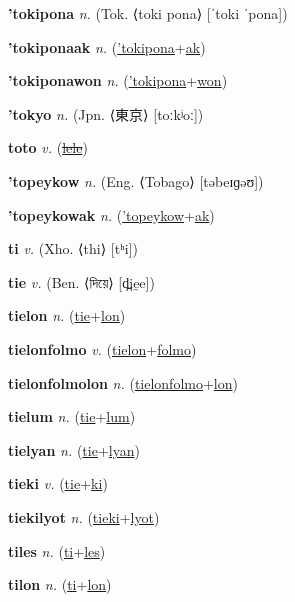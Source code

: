 \textbf{\hypertarget{'tokipona}{'tokipona}} \textit{n.} (Tok. ⟨toki pona⟩ [ˈtoki ˈpona])


\textbf{\hypertarget{'tokiponaak}{'tokiponaak}} \textit{n.} (\hyperlink{'tokipona}{'tokipona}+\allowbreak \hyperlink{ak}{ak})


\textbf{\hypertarget{'tokiponawon}{'tokiponawon}} \textit{n.} (\hyperlink{'tokipona}{'tokipona}+\allowbreak \hyperlink{won}{won})


\textbf{\hypertarget{'tokyo}{'tokyo}} \textit{n.} (Jpn. ⟨{\japanese{}東京}⟩ [toːkʲoː])


\textbf{\hypertarget{toto}{toto}} \textit{v.} (\hyperlink{lele}{\sout{lele}})


\textbf{\hypertarget{'topeykow}{'topeykow}} \textit{n.} (Eng. ⟨Tobago⟩ [təbeɪɡəʊ])


\textbf{\hypertarget{'topeykowak}{'topeykowak}} \textit{n.} (\hyperlink{'topeykow}{'topeykow}+\allowbreak \hyperlink{ak}{ak})


\textbf{\hypertarget{ti}{ti}} \textit{v.} (Xho. ⟨thi⟩ [tʰi])


\textbf{\hypertarget{tie}{tie}} \textit{v.} (Ben. ⟨{\bengali{}দিয়ে}⟩ [d̪ie̯e])


\textbf{\hypertarget{tielon}{tielon}} \textit{n.} (\hyperlink{tie}{tie}+\allowbreak \hyperlink{lon}{lon})


\textbf{\hypertarget{tielonfolmo}{tielonfolmo}} \textit{v.} (\hyperlink{tielon}{tielon}+\allowbreak \hyperlink{folmo}{folmo})


\textbf{\hypertarget{tielonfolmolon}{tielonfolmolon}} \textit{n.} (\hyperlink{tielonfolmo}{tielonfolmo}+\allowbreak \hyperlink{lon}{lon})


\textbf{\hypertarget{tielum}{tielum}} \textit{n.} (\hyperlink{tie}{tie}+\allowbreak \hyperlink{lum}{lum})


\textbf{\hypertarget{tielyan}{tielyan}} \textit{n.} (\hyperlink{tie}{tie}+\allowbreak \hyperlink{lyan}{lyan})


\textbf{\hypertarget{tieki}{tieki}} \textit{v.} (\hyperlink{tie}{tie}+\allowbreak \hyperlink{ki}{ki})


\textbf{\hypertarget{tiekilyot}{tiekilyot}} \textit{n.} (\hyperlink{tieki}{tieki}+\allowbreak \hyperlink{lyot}{lyot})


\textbf{\hypertarget{tiles}{tiles}} \textit{n.} (\hyperlink{ti}{ti}+\allowbreak \hyperlink{les}{les})


\textbf{\hypertarget{tilon}{tilon}} \textit{n.} (\hyperlink{ti}{ti}+\allowbreak \hyperlink{lon}{lon})


